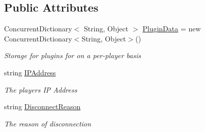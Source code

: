 \subsection*{Public Attributes}
\begin{DoxyCompactItemize}
\item 
Concurrent\+Dictionary$<$ String, Object $>$ \hyperlink{class_o_t_a_1_1_base_player_aaeaf4534cc6c64b56a0f94dc835f177f}{Plugin\+Data} = new Concurrent\+Dictionary$<$String, Object$>$()
\begin{DoxyCompactList}\small\item\em Storage for plugins for on a per-\/player basis \end{DoxyCompactList}\item 
string \hyperlink{class_o_t_a_1_1_base_player_a07c975cec8f563662737ac1bf7cb331c}{I\+P\+Address}
\begin{DoxyCompactList}\small\item\em The players I\+P Address \end{DoxyCompactList}\item 
string \hyperlink{class_o_t_a_1_1_base_player_a248ebc843dee79d049d443a5d277c0f0}{Disconnect\+Reason}
\begin{DoxyCompactList}\small\item\em The reason of disconnection \end{DoxyCompactList}\end{DoxyCompactItemize}

